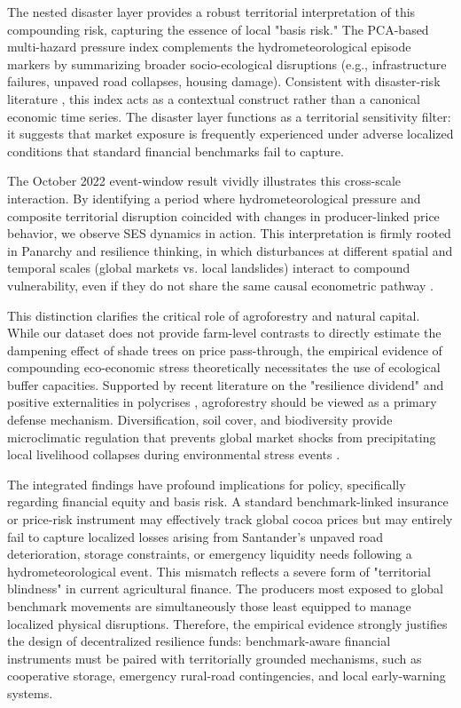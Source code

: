 \documentclass[11pt]{article}
\begin{document}
The nested disaster layer provides a robust territorial interpretation of this compounding risk, capturing the essence of local "basis risk." The PCA-based multi-hazard pressure index complements the hydrometeorological episode markers by summarizing broader socio-ecological disruptions (e.g., infrastructure failures, unpaved road collapses, housing damage). Consistent with disaster-risk literature \citep{Cutter2008,Tate2012,Garschagen2021}, this index acts as a contextual construct rather than a canonical economic time series. The disaster layer functions as a territorial sensitivity filter: it suggests that market exposure is frequently experienced under adverse localized conditions that standard financial benchmarks fail to capture. 

The October 2022 event-window result vividly illustrates this cross-scale interaction. By identifying a period where hydrometeorological pressure and composite territorial disruption coincided with changes in producer-linked price behavior, we observe SES dynamics in action. This interpretation is firmly rooted in Panarchy and resilience thinking, in which disturbances at different spatial and temporal scales (global markets vs. local landslides) interact to compound vulnerability, even if they do not share the same causal econometric pathway \citep{Folke2006,GundersonHolling2002,Zurek2022}.

This distinction clarifies the critical role of agroforestry and natural capital. While our dataset does not provide farm-level contrasts to directly estimate the dampening effect of shade trees on price pass-through, the empirical evidence of compounding eco-economic stress theoretically necessitates the use of ecological buffer capacities. Supported by recent literature on the "resilience dividend" and positive externalities in polycrises \citep{Mechler2025}, agroforestry should be viewed as a primary defense mechanism. Diversification, soil cover, and biodiversity provide microclimatic regulation that prevents global market shocks from precipitating local livelihood collapses during environmental stress events \citep{VaastSomarriba2014,Schroth2016,IfejikaSperanza2013}.

The integrated findings have profound implications for policy, specifically regarding financial equity and basis risk. A standard benchmark-linked insurance or price-risk instrument may effectively track global cocoa prices but may entirely fail to capture localized losses arising from Santander's unpaved road deterioration, storage constraints, or emergency liquidity needs following a hydrometeorological event. This mismatch reflects a severe form of "territorial blindness" in current agricultural finance. The producers most exposed to global benchmark movements are simultaneously those least equipped to manage localized physical disruptions. Therefore, the empirical evidence strongly justifies the design of decentralized resilience funds: benchmark-aware financial instruments must be paired with territorially grounded mechanisms, such as cooperative storage, emergency rural-road contingencies, and local early-warning systems.
\end{document}
